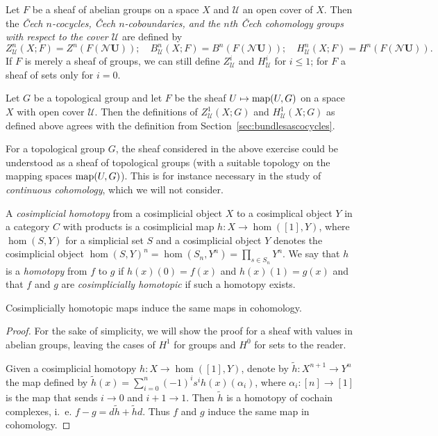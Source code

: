 \documentclass[a4paper,openany]{scrbook}
\newcommand{\nerve}{\mathcal N}
\begin{document}
\begin{defn}
Let $F$ be a sheaf of abelian groups on a space $X$ and $\mathcal U$ an open cover of $X$. Then the \emph{Čech $n$-cocycles, Čech $n$-coboundaries, and the $n$th Čech cohomology groups with respect to the cover $\mathcal U$} are defined by
\[
Z^n_{\mathcal U}(X;F) = Z^n(F(\nerve \mathbf U)); \quad B^n_{\mathcal U}(X;F) = B^n(F(\nerve \mathbf U)); \quad H^n_{\mathcal U}(X;F) = H^n(F(\nerve \mathbf U)).
\]
If $F$ is merely a sheaf of groups, we can still define $Z^i_{\mathcal U}$ and $H^i_{\mathcal U}$ for $i \leq 1$; for $F$ a sheaf of sets only for $i=0$.
\end{defn}

\begin{exer}
	Let $G$ be a topological group and let $F$ be the sheaf $U \mapsto \operatorname{map}(U,G)$ on a space $X$ with open cover $\mathcal{U}$. Then the definitions of $Z^1_{\mathcal U}(X;G)$ and $H^1_{\mathcal{U}}(X;G)$ as defined above agrees with the definition from Section~\ref{sec:bundlesascocycles}.
\end{exer}	
	
\begin{remark}
For a topological group $G$, the sheaf considered in the above exercise could be understood as a sheaf of topological groups (with a suitable topology on the mapping spaces $\operatorname{map}(U,G)$). This is for instance necessary in the study of \emph{continuous cohomology}, which we will not consider. 
\end{remark}

\begin{defn}
A \emph{cosimplicial homotopy} from a cosimplicial object $X$ to a cosimplical object $Y$ in a category $C$ with products is a cosimplicial map $h\colon X \to \hom([1],Y)$, where $\hom(S,Y)$ for a simplicial set $S$ and a cosimplicial object $Y$ denotes the cosimplicial object $\hom(S,Y)^n = \hom(S_n,Y^n) = \prod_{s \in S_n} Y^n$. We say that $h$ is a \textit{homotopy} from $f$ to $g$ if $h(x)(0)=f(x)$ and $h(x)(1)=g(x)$ and that $f$ and $g$ are \emph{cosimplicially homotopic} if such a homotopy exists. 
\end{defn}

\begin{lemma}\label{lemma:cosimphomotopicmaps}
Cosimplicially homotopic maps induce the same maps in cohomology.
\end{lemma}
\begin{proof}
For the sake of simplicity, we will show the proof for a sheaf with values in abelian groups, leaving the cases of $H^1$ for groups and $H^0$ for sets to the reader.

Given a cosimplicial homotopy $h\colon X \to \hom([1],Y)$, denote by $\tilde h\colon X^{n+1} \to Y^n$ the map defined by $\tilde h(x) = \sum_{i=0}^n (-1)^i s^i h(x)(\alpha_i)$, where $\alpha_i\colon [n]\to[1]$ is the map that sends $i \to 0$ and $i+1 \to 1$. Then $\tilde h$ is a homotopy of cochain complexes, i.~e. $f-g = d\tilde h + \tilde h d$.  Thus $f$ and $g$ induce the same map in cohomology.
\end{proof}
\end{document}
